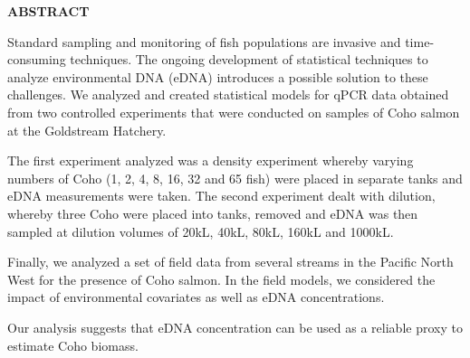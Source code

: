 \newpage
{}



\begin{center}
\textbf{ABSTRACT}
\end{center}


Standard sampling and monitoring of fish populations are invasive and time-consuming techniques. The ongoing development of statistical techniques to analyze environmental DNA (eDNA) introduces a possible solution to these challenges. We analyzed and created statistical models for qPCR data obtained from two controlled experiments that were conducted on samples of Coho salmon at the Goldstream Hatchery.

\vspace{5mm}

The first experiment analyzed was a density experiment whereby varying numbers of Coho (1, 2, 4, 8, 16, 32 and 65 fish) were placed in separate tanks and eDNA measurements were taken. The second experiment dealt with dilution, whereby three Coho were placed into tanks, removed and eDNA was then sampled at dilution volumes of 20kL, 40kL, 80kL, 160kL and 1000kL.

\vspace{5mm}

Finally, we analyzed a set of field data from several streams in the Pacific North West for the presence of Coho salmon. In the field models, we considered the impact of environmental covariates as well as eDNA concentrations.

\vspace{5mm}

 Our analysis suggests that eDNA concentration can be used as a reliable proxy to estimate Coho biomass. 
